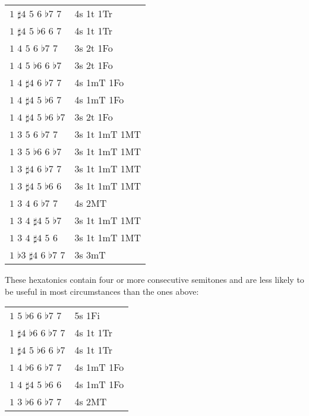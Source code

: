 \documentclass[english]{./gbook}
\begin{document}
\begin{large}
\begin{tabular}{ll}
    $1$ $\sharp4$ $5$ $6$ $\flat7$ $7$   &   4s 1t 1Tr      \\
    $1$ $\sharp4$ $5$ $\flat6$ $6$ $7$   &   4s 1t 1Tr      \\
    $1$ $4$ $5$ $6$ $\flat7$ $7$   &   3s 2t 1Fo      \\
    $1$ $4$ $5$ $\flat6$ $6$ $\flat7$   &   3s 2t 1Fo      \\
    $1$ $4$ $\sharp4$ $6$ $\flat7$ $7$   &   4s 1mT 1Fo      \\
    $1$ $4$ $\sharp4$ $5$ $\flat6$ $7$   &   4s 1mT 1Fo      \\
    $1$ $4$ $\sharp4$ $5$ $\flat6$ $\flat7$   &   3s 2t 1Fo      \\
    $1$ $3$ $5$ $6$ $\flat7$ $7$   &   3s 1t 1mT 1MT      \\
    $1$ $3$ $5$ $\flat6$ $6$ $\flat7$   &   3s 1t 1mT 1MT      \\
    $1$ $3$ $\sharp4$ $6$ $\flat7$ $7$   &   3s 1t 1mT 1MT      \\
    $1$ $3$ $\sharp4$ $5$ $\flat6$ $6$   &   3s 1t 1mT 1MT      \\
    $1$ $3$ $4$ $6$ $\flat7$ $7$   &   4s 2MT      \\
    $1$ $3$ $4$ $\sharp4$ $5$ $\flat7$   &   3s 1t 1mT 1MT      \\
    $1$ $3$ $4$ $\sharp4$ $5$ $6$   &   3s 1t 1mT 1MT      \\
    $1$ $\flat3$ $\sharp4$ $6$ $\flat7$ $7$   &   3s 3mT      \\
\end{tabular}

These hexatonics contain four or more consecutive semitones and are less likely to be useful in most circumstances than the ones above:

\begin{tabular}{ll}
    $1$ $5$ $\flat6$ $6$ $\flat7$ $7$   &   5s 1Fi      \\
    $1$ $\sharp4$ $\flat6$ $6$ $\flat7$ $7$   &   4s 1t 1Tr      \\
    $1$ $\sharp4$ $5$ $\flat6$ $6$ $\flat7$   &   4s 1t 1Tr      \\
    $1$ $4$ $\flat6$ $6$ $\flat7$ $7$   &   4s 1mT 1Fo      \\
    $1$ $4$ $\sharp4$ $5$ $\flat6$ $6$   &   4s 1mT 1Fo      \\
    $1$ $3$ $\flat6$ $6$ $\flat7$ $7$   &   4s 2MT      \\
\end{tabular}


\end{large}
\end{document}
